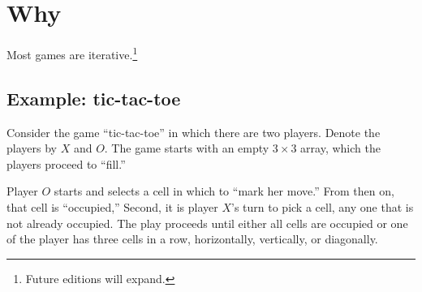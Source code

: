 
\section*{Why}

Most games are iterative.\footnote{Future editions will expand.}

\subsection*{Example: tic-tac-toe}

Consider the game ``tic-tac-toe'' in which there are two players.
Denote the players by $X$ and $O$.
The game starts with an empty $3 \times 3$ array, which the players proceed to ``fill.''

Player $O$ starts and selects a cell in which to ``mark her move.''
From then on, that cell is ``occupied,''
Second, it is player $X$'s turn to pick a cell, any one that is not already occupied.
The play proceeds until either all cells are occupied or one of the player has three cells in a row, horizontally, vertically, or diagonally.

\blankpage